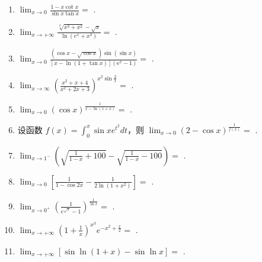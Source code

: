 \documentclass[12pt, a4paper]{ctexart}
\begin{document}
\begin{enumerate}[start=29]
    \item $ \lim_{x \to 0} \frac{1 - x \cot x}{\sin x \tan x} = $ \underline{\hspace{2cm}}.
    
    \item $ \lim_{x \to +\infty} \frac{\sqrt[3]{x^3 + x^2} - \sqrt{x}}{\ln(e^x + x^3)} = $ \underline{\hspace{2cm}}.

    \item $ \lim_{x\to0}\frac{\left(\cos x-\sqrt{\cos x}\right)\sin\left(\sin x\right)}{\left[x-\ln\left(1+\tan x\right)\right]\left(\mathrm{e}^{x}-1\right)}= $ \underline{\hspace{2cm}}.

    \item $ \lim_{x\to\infty}\left(\frac{x^{2}+x+4}{x^{2}+2x+3}\right)^{x^{2}\sin\frac{2}{x}}= $ \underline{\hspace{2cm}}.
    
    \item $ \lim_{x\to0}(\cos x)^{\frac{1}{x-\ln(1+x)}}= $ \underline{\hspace{2cm}}.

    \item 设函数 $ f(x)=\int_{0}^{x}\sin x e^{t^{2}}dt $，则 $ \lim_{x\to0}\left(2-\cos x\right)^{\frac{1}{f(x)}}= $ \underline{\hspace{2cm}}.

    \item $ \lim_{x\to1^{-}}\left(\sqrt{\frac{1}{1-x}+100}-\sqrt{\frac{1}{1-x}-100}\right)= $ \underline{\hspace{2cm}}.
    
    \item $ \lim_{x\to0}\left[\frac{1}{1-\cos2x}-\frac{1}{2\ln\left(1+x^{2}\right)}\right]= $ \underline{\hspace{2cm}}.

    \item $ \lim_{x \to 0^+} \left( \frac{1}{e^{\sqrt{x}} - 1} \right)^{\frac{1}{\ln x}} = $ \underline{\hspace{2cm}}.

    \item $ \lim_{x \to +\infty} \left(1 + \frac{1}{x}\right)^{x^3} e^{-x^2 + \frac{x}{2}} = $ \underline{\hspace{2cm}}.
    
    \item $ \lim_{x \to +\infty} \left[ \sin \ln(1 + x) - \sin \ln x \right] = $ \underline{\hspace{2cm}}.


\end{enumerate}
\end{document}
